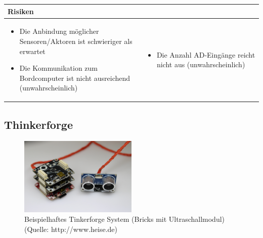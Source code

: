 \begin{table}[h]
\begin{tabular}{p{}p{}}


 \textbf{Risiken} & \\ \hline
	 
\begin{itemize}
\item Die Anbindung möglicher Sensoren/Aktoren ist schwieriger als erwartet
\item Die Kommunikation zum Bordcomputer ist nicht ausreichend (unwahrscheinlich)
\end{itemize}
&
\begin{itemize}
\item Die Anzahl AD-Eingänge reicht nicht aus (unwahrscheinlich)
\end{itemize}

 
\end{tabular}
\end{table}

\pagebreak


\subsection{Thinkerforge}
\begin{figure}[h]
	\centering
	\includegraphics[width=0.5\textwidth]{fig/Tinkerforge.png}
	\caption{Beispielhaftes Tinkerforge System (Bricks mit Ultraschallmodul) (Quelle: http://www.heise.de)}
\end{figure}

